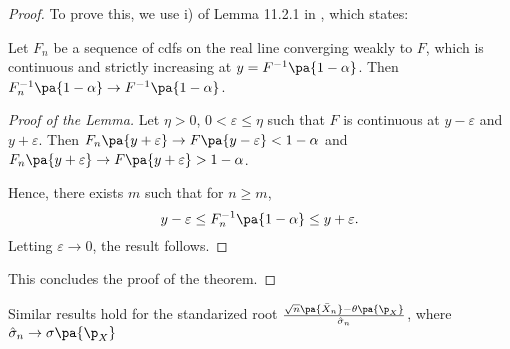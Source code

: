 \begin{proof}
  To prove this, we use i) of Lemma 11.2.1 in \cite{lehmann2005testing}, which states:
  \begin{lemma}[Lemma 11.2.1]
    Let $F_n$ be a sequence of cdfs on the real line converging weakly to $F$, which is continuous and strictly increasing at $y = F^{-1}\pa{1-\alpha}$. Then $F_n^{-1} \pa{1-\alpha} \rightarrow F^{-1}\pa{1-\alpha}$.
  \end{lemma}
  \begin{proof}[Proof of the Lemma]
    Let $\eta >0 $, $0< \varepsilon \leq \eta$ such that $F$ is continuous at $y-\varepsilon$ and $y+\varepsilon$. Then $F_n\pa{y + \varepsilon} \rightarrow F\pa{y-\varepsilon}<1-\alpha$ and $F_n \pa{y+\varepsilon} \rightarrow F\pa{y+\varepsilon}  > 1-\alpha$.

    Hence, there exists $m$ such that for $n\geq m$,
    \begin{equation}
      y-\varepsilon \leq F_n^{-1} \pa{1-\alpha}\leq y + \varepsilon.
    \end{equation}
    Letting $\varepsilon\rightarrow 0$, the result follows.
  \end{proof}
  This concludes the proof of the theorem.
\end{proof}

\begin{remark}
  Similar results hold for the standarized root $\frac{\sqrt{n}\pa{\bar{X}_n}-\theta\pa{\p_X}}{\hat{\sigma}_n}$, where $\hat{\sigma}_n \rightarrow \sigma\pa{\p_X}$
\end{remark}

